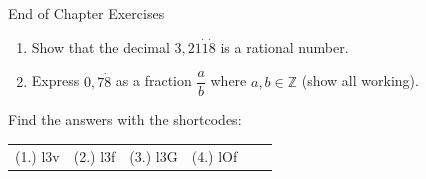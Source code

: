 \begin{eocexercises}{End of Chapter Exercises}
\begin{enumerate}[itemsep=5pt, label=\textbf{\arabic*}. ]
\begin{enumerate}[itemsep=5pt, label=\textbf{\alph*}. ]
\end{enumerate}
\label{m38348*uid52}\item Show that the decimal $3,21\dot{1}\dot{8}$ is a rational number.
\newline
\label{m38348*uid53}\item Express $0,7\dot{8}$ as a fraction $\dfrac{a}{b}$ where $a,b\in \mathbb{Z}$ (show all working).
\newline
\end{enumerate}
  \label{m38348**end}
\par {} Find the answers with the shortcodes:
 \par \begin{tabular}[h]{cccccc}
 (1.) l3v  &  (2.) l3f  &  (3.) l3G  &  (4.) lOf  & \end{tabular}

\end{eocexercises}
